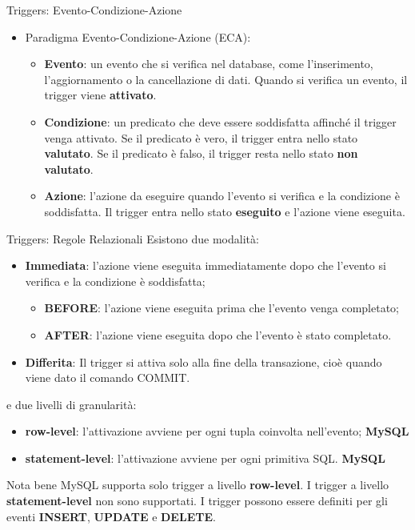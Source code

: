 %
\begin{frame}{Triggers: Evento-Condizione-Azione}
    \begin{itemize}
        \item Paradigma Evento-Condizione-Azione (ECA):
            \begin{itemize}
                \item \textbf{Evento}: un evento che si verifica nel database, come l'inserimento, l'aggiornamento o la cancellazione di dati.
                Quando si verifica un evento, il trigger viene \textbf{attivato}.
                \item \textbf{Condizione}: un predicato che deve essere soddisfatta affinch\'e il trigger venga attivato.
                Se il predicato \`e vero, il trigger entra nello stato \textbf{valutato}. Se il predicato \`e falso, il trigger resta nello stato \textbf{non valutato}.
                \item \textbf{Azione}: l'azione da eseguire quando l'evento si verifica e la condizione \`e soddisfatta.
                Il trigger entra nello stato \textbf{eseguito} e l'azione viene eseguita.
            \end{itemize}
    \end{itemize}
\end{frame}
%
\begin{frame}{Triggers: Regole Relazionali}
    Esistono due modalit\`a:
    \begin{itemize}
        \item \textbf{Immediata}: l'azione viene eseguita immediatamente dopo che l'evento si verifica e la condizione \`e soddisfatta;
        \begin{itemize}
            \item \textbf{BEFORE}: l'azione viene eseguita prima che l'evento venga completato;
            \item \textbf{AFTER}: l'azione viene eseguita dopo che l'evento \`e stato completato.
        \end{itemize}
        \item \textbf{Differita}: Il trigger si attiva solo alla fine della transazione, cio\`e quando viene dato il comando COMMIT.
    \end{itemize}
    e due livelli di granularit\`a:
    \begin{itemize}
        \item \textbf{row-level}: l'attivazione avviene per ogni tupla coinvolta nell'evento; \textbf{MySQL} \checkmark
        \item \textbf{statement-level}: l'attivazione avviene per ogni primitiva SQL. \textbf{MySQL} \xmark
    \end{itemize}

    \begin{block}{Nota bene}
        MySQL supporta solo trigger a livello \textbf{row-level}.
        I trigger a livello \textbf{statement-level} non sono supportati.
        I trigger possono essere definiti per gli eventi \textbf{INSERT}, \textbf{UPDATE} e \textbf{DELETE}.
    \end{block}
\end{frame}
